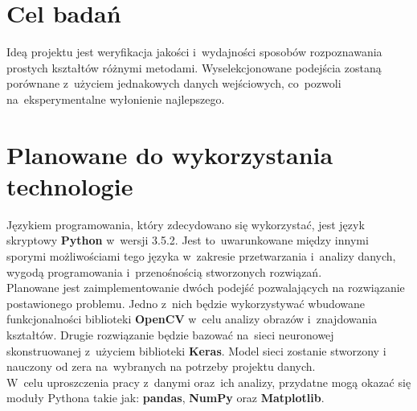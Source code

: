 \documentclass[11pt,a4paper]{article}
\begin{document}
\section{Cel badań} %

Ideą projektu jest weryfikacja jakości i~wydajności sposobów rozpoznawania prostych kształtów różnymi metodami. Wyselekcjonowane podejścia zostaną porównane z~użyciem jednakowych danych wejściowych, co~pozwoli na~eksperymentalne wyłonienie najlepszego.

\section{Planowane do wykorzystania technologie}

Językiem programowania, który zdecydowano się wykorzystać, jest język skryptowy \textbf{Python} w~wersji 3.5.2.
Jest to~uwarunkowane między innymi sporymi możliwościami tego języka w~zakresie przetwarzania i~analizy danych, wygodą programowania i~przenośnością stworzonych rozwiązań.\\

Planowane jest zaimplementowanie dwóch podejść pozwalających na rozwiązanie postawionego problemu. Jedno z~nich będzie wykorzystywać wbudowane funkcjonalności biblioteki \textbf{OpenCV} w~celu analizy obrazów i~znajdowania kształtów. Drugie rozwiązanie będzie bazować na~sieci neuronowej skonstruowanej z~użyciem biblioteki \textbf{Keras}. Model sieci zostanie stworzony i nauczony od zera na~wybranych na potrzeby projektu danych.\\

W~celu uproszczenia pracy z~danymi oraz~ich analizy, przydatne mogą okazać się moduły Pythona takie jak: \textbf{pandas}, \textbf{NumPy} oraz \textbf{Matplotlib}.\\
\end{document}
